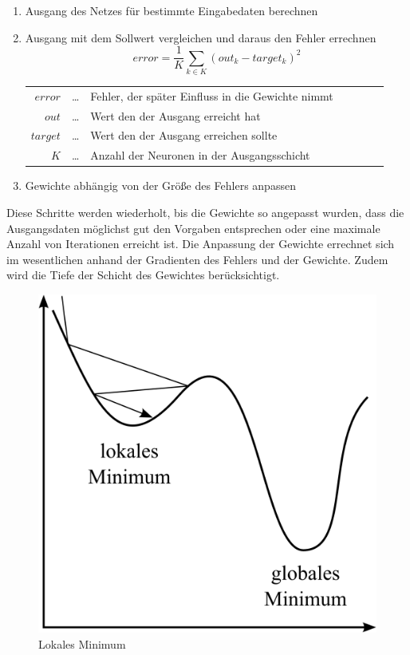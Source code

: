 \begin{enumerate}
\item Ausgang des Netzes für bestimmte Eingabedaten berechnen
\item Ausgang mit dem Sollwert vergleichen und daraus den Fehler errechnen
	$$error = \frac{1}{K}\sum_{k \in K}(out_k-target_k)^2$$
	\begin{center}\begin{tabular}{rclcrcl}
		$error$ & \dots & Fehler, der später Einfluss in die Gewichte nimmt\\
		$out$ & \dots & Wert den der Ausgang erreicht hat\\
		$target$ & \dots & Wert den der Ausgang erreichen sollte\\ 
		$K$ & \dots & Anzahl der Neuronen in der Ausgangsschicht\\
	\end{tabular}\end{center}
\item Gewichte abhängig von der Größe des Fehlers anpassen
\end{enumerate}

Diese Schritte werden wiederholt, bis die Gewichte so angepasst wurden, dass die Ausgangsdaten möglichst gut den Vorgaben entsprechen oder eine maximale Anzahl von Iterationen erreicht ist. Die Anpassung der Gewichte errechnet sich im wesentlichen anhand der Gradienten des Fehlers und der Gewichte. Zudem wird die Tiefe der Schicht des Gewichtes berücksichtigt.

\begin{figure}
	\centering
	\includegraphics[scale=1]{images/lokales-minimum.png}
	\caption{Lokales Minimum}
	\label{fig:local-min}
\end{figure}

